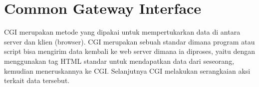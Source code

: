 
\section{Common Gateway Interface}
CGI merupakan metode yang dipakai untuk mempertukarkan data di antara server dan klien (browser). CGI merupakan sebuah standar dimana program atau script bisa mengirim data kembali ke web server dimana ia diproses, yaitu dengan menggunakan tag HTML standar untuk mendapatkan data dari seseorang, kemudian meneruskannya ke CGI. Selanjutnya CGI melakukan serangkaian aksi terkait data tersebut\cite{prihatmoko2013pengembangan}.